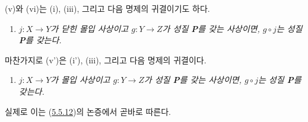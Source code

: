 \begin{env}[5.5.13]
\label{I.5.5.13-ko}
(v)와 (vi)는 (i), (iii), 그리고 다음 명제의 귀결이기도 하다.
\begin{enumerate}
  \item[\rm(ii')] \emph{$j:X\to Y$가 닫힌 몰입 사상이고 $g:Y\to Z$가
    성질 \textbf{P}를 갖는 사상이면, $g\circ j$는 성질 \textbf{P}를
    갖는다.}
\end{enumerate}
마찬가지로 (v')은 (i'), (iii), 그리고 다음 명제의 귀결이다.
\begin{enumerate}
  \item[\rm(ii'')] \emph{$j:X\to Y$가 몰입 사상이고 $g:Y\to Z$가
    성질 \textbf{P}를 갖는 사상이면, $g\circ j$는 성질 \textbf{P}를
    갖는다.}
\end{enumerate}
실제로 이는 (\hyperref[I.5.5.12-ko]{5.5.12})의 논증에서 곧바로
따른다.
\end{env}
